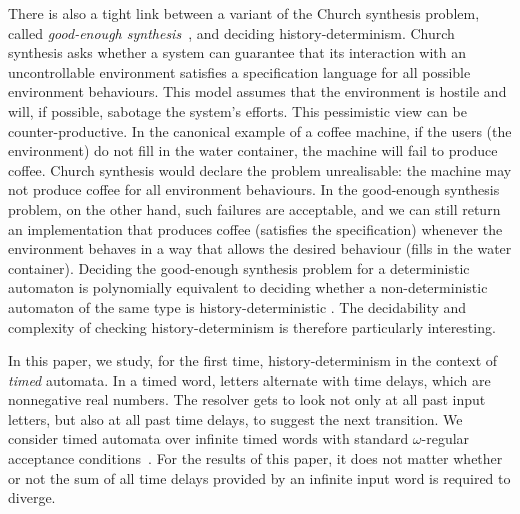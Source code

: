 There is also a tight link between a variant of the Church synthesis
problem, called \textit{good-enough synthesis}~\cite{AK20}, and deciding
history-determinism.
Church synthesis asks whether a system can guarantee that its interaction with
an uncontrollable environment satisfies a specification language for all possible
environment behaviours.
This model assumes that the environment is hostile and will, if possible,
sabotage the system's efforts.
This pessimistic view can be counter-productive.
In the canonical example of a coffee machine,
if the users (the environment) do not fill in the water container, the machine
will fail to produce coffee.
Church synthesis would declare the problem unrealisable: the machine
may not produce coffee for all environment behaviours.
In the good-enough synthesis problem, on the other hand, such failures are
acceptable, and we can still return an implementation that produces coffee
(satisfies the specification) whenever the environment behaves in a way that
allows the desired behaviour (fills in the water container).
Deciding the good-enough synthesis problem for a deterministic automaton is
polynomially equivalent to deciding whether a non-deterministic automaton of
the same type is history-deterministic \cite{FLW20,BL21,GJLZ21}.
The decidability and complexity
of checking history-determinism is therefore particularly interesting.

In this paper, we study, for the first time, history-determinism in the context
of \emph{timed} automata.
In a timed word, letters alternate with time delays, which are nonnegative real
numbers.
The resolver gets to look not only at all past input letters,
but also at all past time delays, to suggest the next transition.
We consider timed automata over infinite timed words with standard
$\omega$-regular acceptance conditions~\cite{AD1994}.
For the results of this paper, it does not matter whether or not the sum of all
time delays provided by an infinite input word is required to diverge.

